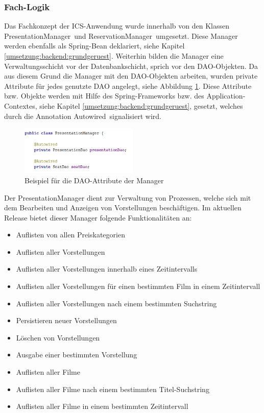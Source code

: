 	\subsubsection{Fach-Logik}	
	Das Fachkonzept der \ac{ICS}-Anwendung wurde innerhalb von den Klassen \glqq PresentationManager\grqq \, und \glqq ReservationManager\grqq \, umgesetzt. Diese Manager werden ebenfalls als Spring-Bean deklariert, siehe Kapitel \ref{umsetzung:backend:grundgeruest}. Weiterhin bilden die Manager eine Verwaltungsschicht vor der Datenbankschicht, sprich vor den \ac{DAO}-Objekten. Da aus diesem Grund die Manager mit den \ac{DAO}-Objekten arbeiten, wurden private Attribute für jedes genutzte \ac{DAO} angelegt, siehe Abbildung \ref{fig:manager_dao}. Diese Attribute bzw. Objekte werden mit Hilfe des Spring-Frameworks bzw. des Application-Contextes, siehe Kapitel \ref{umsetzung:backend:grundgeruest}, gesetzt, welches durch die Annotation \glqq Autowired\grqq \, signalisiert wird. 
	
	\begin{figure}[H]
		\centering 
		\includegraphics[width=0.5\textwidth]{img/manager_dao}
		\captionsetup{format=hang}
		\caption[Beispiel für die DAO-Attribute der Manager]{\label{fig:manager_dao}Beispiel für die \ac{DAO}-Attribute der Manager}
	\end{figure}	
		
	Der PresentationManager dient zur Verwaltung von Prozessen, welche sich mit dem Bearbeiten und Anzeigen von Vorstellungen beschäftigen. Im aktuellen Release bietet dieser Manager folgende Funktionalitäten an:
	
	\begin{itemize}
		\setlength\itemsep{-0.5em}
		\item Auflisten von allen Preiskategorien
		\item Auflisten aller Vorstellungen
	    \item Auflisten aller Vorstellungen innerhalb eines Zeitintervalls
		\item Auflisten aller Vorstellungen für einen bestimmten Film in einem Zeitintervall
		\item Auflisten aller Vorstellungen nach einem bestimmten Suchstring
		\item Persistieren neuer Vorstellungen
		\item Löschen von Vorstellungen
		\item Ausgabe einer bestimmten Vorstellung
		\item Auflisten aller Filme
		\item Auflisten aller Filme nach einem bestimmten Titel-Suchstring
		\item Auflisten aller Filme in einem bestimmten Zeitintervall
	\end{itemize}

